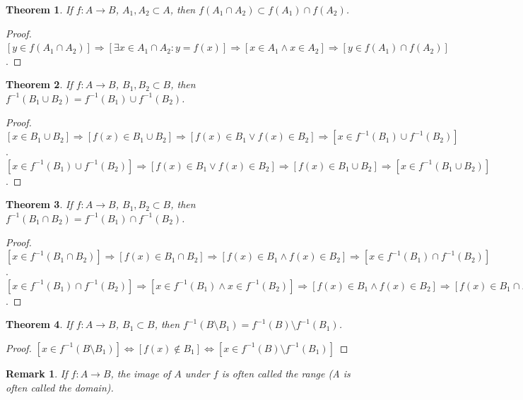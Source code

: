 \documentclass[oneside]{book}
\theoremstyle{mystyle}
\newtheorem{theorem}{Theorem}[section]
\newtheorem{remark}{Remark}[section]
\begin{document}
\begin{theorem}
If $f:A\rightarrow B$, $A_1,A_2\subset A$, then $f(A_1\cap A_2)\subset f(A_1)\cap f(A_2)$.
\end{theorem}
\begin{proof}
$[y\in f(A_1 \cap A_2)]\Rightarrow [\exists x\in A_1 \cap A_2:y=f(x)]\Rightarrow [x\in A_1 \land x \in A_2] \Rightarrow[y \in f(A_1)\cap f(A_2)]$.
\end{proof}

\begin{theorem}
If $f:A\rightarrow B$, $B_1,B_2\subset B$, then $f^{-1}(B_1\cup B_2) = f^{-1}(B_1)\cup f^{-1}(B_2)$.
\end{theorem}
\begin{proof}
$[x\in B_1\cup B_2]\Rightarrow [f(x)\in B_1\cup B_2]\Rightarrow [f(x)\in B_1\lor f(x)\in B_2]\Rightarrow [x\in f^{-1}(B_1)\cup f^{-1}(B_2)]$. $[x \in f^{-1}(B_1)\cup f^{-1}(B_2)]\Rightarrow [f(x)\in B_1\lor f(x) \in B_2]\Rightarrow [f(x) \in B_1\cup B_2]\Rightarrow [x\in f^{-1}(B_1\cup B_2)]$.
\end{proof}

\begin{theorem}
If $f:A\rightarrow B$, $B_1,B_2\subset B$, then $f^{-1}(B_1\cap B_2) = f^{-1}(B_1)\cap f^{-1}(B_2)$.
\end{theorem}
\begin{proof}
$[x\in f^{-1}(B_1\cap B_2)]\Rightarrow [f(x) \in B_1 \cap B_2]\Rightarrow [f(x)\in B_1\land f(x) \in B_2 ]\Rightarrow [x\in f^{-1}(B_1)\cap f^{-1}(B_2)]$. $[x\in f^{-1}(B_1)\cap f^{-1}(B_2)]\Rightarrow [x\in f^{-1}(B_1)\land x\in f^{-1}(B_2)]\Rightarrow [f(x) \in B_1\land f(x) \in B_2]\Rightarrow [f(x)\in B_1\cap B_2]\Rightarrow [x\in f^{-1}(B_1\cap B_2)]$.
\end{proof}

\begin{theorem}
If $f:A\rightarrow B$, $B_1 \subset B$, then $f^{-1}(B\setminus B_1) = f^{-1}(B)\setminus f^{-1}(B_1)$.
\end{theorem}
\begin{proof}
$[x\in f^{-1}(B\setminus B_1)]\Leftrightarrow [f(x)\notin B_1]\Leftrightarrow [x\in f^{-1}(B)\setminus f^{-1}(B_1)]$
\end{proof}

\begin{remark}
If $f:A\rightarrow B$, the image of $A$ under $f$ is often called the range (A is often called the domain).
\end{remark}
\end{document}
